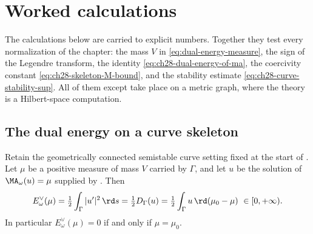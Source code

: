 \section{Worked calculations}
\label{sec:ch28-curves}

The calculations below are carried to explicit numbers.  Together they test
every normalization of the chapter: the mass $V$ in
\eqref{eq:dual-energy-measure}, the sign of the Legendre transform, the
identity \eqref{eq:ch28-dual-energy-of-ma}, the coercivity constant
\eqref{eq:ch28-skeleton-M-bound}, and the stability estimate
\eqref{eq:ch28-curve-stability-sup}.  All of them except
 take place on a metric graph, where the
theory is a Hilbert-space computation.

\subsection{The dual energy on a curve skeleton}
\label{sec:ch28-curve-dual-energy}

\begin{proposition}
\label{prop:ch28-curve-dual-energy}
Retain the geometrically connected semistable curve setting fixed at the
start of .  Let $\mu$ be a positive measure
of mass $V$ carried by $\Gamma$, and let $u$ be the solution of
$\MA_\omega(u)=\mu$ supplied by .  Then
\begin{equation}
\label{eq:ch28-curve-dual-energy}
 E^\vee_\omega(\mu)
 =\tfrac12\int_\Gamma|u'|^2\,\rd s
 =\tfrac12 D_\Gamma(u)
 =\tfrac12\int_\Gamma u\,\rd(\mu_0-\mu)
 \ \in[0,+\infty).
\end{equation}
In particular $E^\vee_\omega(\mu)=0$ if and only if $\mu=\mu_0$.
\end{proposition}

